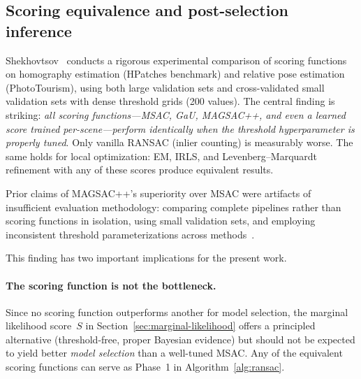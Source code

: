 \documentclass[11pt]{article}
\begin{document}
\subsection{Scoring equivalence and post-selection inference}
\label{sec:scoring-equivalence}

Shekhovtsov~\cite{shekhovtsov2025scoring} conducts a rigorous
experimental comparison of scoring functions on homography estimation
(HPatches benchmark) and relative pose estimation (PhotoTourism),
using both large validation sets and cross-validated small validation
sets with dense threshold grids (200 values).  The central finding is
striking: \emph{all scoring functions---MSAC, GaU, MAGSAC++, and even
a learned score trained per-scene---perform identically when the
threshold hyperparameter is properly tuned}.  Only vanilla RANSAC
(inlier counting) is measurably worse.  The same holds for local
optimization: EM, IRLS, and Levenberg--Marquardt refinement with any
of these scores produce equivalent results.

Prior claims of MAGSAC++'s superiority over MSAC were artifacts of
insufficient evaluation methodology: comparing complete pipelines
rather than scoring functions in isolation, using small validation
sets, and employing inconsistent threshold parameterizations across
methods~\cite{shekhovtsov2025scoring}.

This finding has two important implications for the present work.

\paragraph{The scoring function is not the bottleneck.}
Since no scoring function outperforms another for model selection, the
marginal likelihood score~$S$ in
Section~\ref{sec:marginal-likelihood} offers a principled alternative
(threshold-free, proper Bayesian evidence) but should not be expected
to yield better \emph{model selection} than a well-tuned MSAC.  Any
of the equivalent scoring functions can serve as Phase~1 in
Algorithm~\ref{alg:ransac}.
\end{document}
